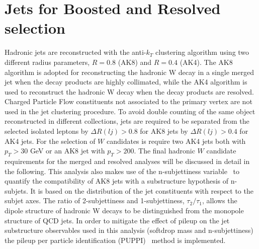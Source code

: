 \section{Jets for Boosted and Resolved selection}
Hadronic jets are reconstructed with the anti-$k_T$ clustering algorithm  using two different
radius parameters, $R = 0.8$ (AK8) and $R = 0.4$ (AK4). The AK8 algorithm is adopted for
reconstructing the hadronic W decay in a single merged jet when the decay products are highly
collimated, while the AK4 algorithm is used to reconstruct the hadronic W decay when the
decay products are resolved.
Charged Particle Flow
constituents not associated to the primary vertex are not used in the jet clustering procedure.
To avoid double counting of the same object
reconstructed in different collections, jets are required to be separated from the selected isolated
leptons by $\Delta R(lj)> 0.8 $ for AK8 jets by  $\Delta R(lj)> 0.4$ for AK4 jets.
For the selection of $W$ candidates is require two AK4 jets both with $p_T>30$ GeV or an AK8 jet with  $p_T>200$.
The final hadronic $W$ candidate requirements for the merged and resolved analyses
will be discussed in detail in the following.
This analysis also makes use of the n-subjettiness variable~\cite{Thaler:2011gf}  to quantify the compatibility
of AK8 jets with a substructure hypothesis of n-subjets. It is based on the distribution of the
jet constituents with respect to the subjet axes. The ratio of 2-subjettiness and 1-subjettiness,
 $\tau_2 /\tau_1$, allows the dipole structure of hadronic W decays to be distinguished from the monopole
structure of QCD jets.
In order to mitigate the effect of pileup on the jet substructure observables used in this analysis
(softdrop mass and n-subjettiness) the pileup per particle identification (PUPPI)~\cite{Bertolini2014} method is
implemented.

